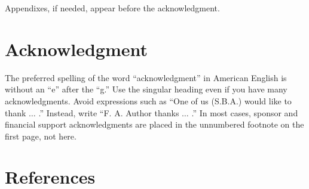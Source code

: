 \documentclass[journal,twoside,web]{ieeecolor}
\begin{document}
\appendices

Appendixes, if needed, appear before the acknowledgment.

\section*{Acknowledgment}

The preferred spelling of the word ``acknowledgment'' in American English is 
without an ``e'' after the ``g.'' Use the singular heading even if you have 
many acknowledgments. Avoid expressions such as ``One of us (S.B.A.) would 
like to thank $\ldots$ .'' Instead, write ``F. A. Author thanks $\ldots$ .'' In most 
cases, sponsor and financial support acknowledgments are placed in the 
unnumbered footnote on the first page, not here.

\section*{References}

\end{document}
